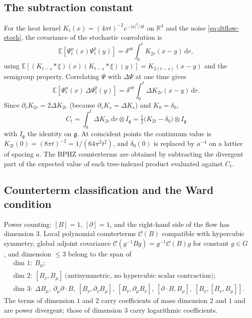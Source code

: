 \documentclass[11pt,a4paper]{article}
\theoremstyle{definition}
\theoremstyle{remark}
\newcommand{\R}{\mathbb{R}}
\newcommand{\E}{\mathbb{E}}
\newcommand{\g}{\mathfrak{g}}
\newcommand{\dd}{\mathrm{d}}
\begin{document}
\subsection{The subtraction constant}

For the heat kernel $K_t(x)=(4\pi t)^{-2}e^{-|x|^2/4t}$ on $\R^4$ and the noise \eqref{eq:dtflow-stoch}, the covariance of the stochastic convolution is
\begin{equation}
\E[\Psi^a_t(x)\Psi^b_t(y)]=\delta^{ab}\int_0^tK_{2r}(x-y)\,\dd r,
\end{equation}
using $\E[(K_{t-s}*\xi)(x)(K_{t-s}*\xi)(y)]=K_{2(t-s)}(x-y)$ and the semigroup property. Correlating $\Psi$ with $\Delta\Psi$ at one time gives
\begin{equation}
\E[\Psi^a_t(x)\,\Delta\Psi^b_t(y)]=\delta^{ab}\int_0^t\Delta K_{2r}(x-y)\,\dd r.
\end{equation}
Since $\partial_rK_{2r}=2\Delta K_{2r}$ (because $\partial_sK_s=\Delta K_s$) and $K_{0}=\delta_0$,
\begin{equation}\label{eq:Ct}
\boxed{\;C_t=\int_0^t\Delta K_{2r}\,\dd r\otimes I_{\g}=\tfrac12\bigl(K_{2t}-\delta_0\bigr)\otimes I_{\g}\;}
\end{equation}
with $I_{\g}$ the identity on $\g$. At coincident points the continuum value is $K_{2t}(0)=(8\pi t)^{-2}=1/(64\pi^2t^2)$, and $\delta_0(0)$ is replaced by $a^{-4}$ on a lattice of spacing $a$. The BPHZ counterterms are obtained by subtracting the divergent part of the expected value of each tree-indexed product evaluated against $C_t$.

\subsection{Counterterm classification and the Ward condition}

Power counting: $[B]=1$, $[\partial]=1$, and the right-hand side of the flow has dimension $3$. Local polynomial counterterms $\mathcal C(B)$ compatible with hypercubic symmetry, global adjoint covariance $\mathcal C(g^{-1}Bg)=g^{-1}\mathcal C(B)g$ for constant $g\in G$, and dimension $\le3$ belong to the span of
\begin{align*}
&\text{dim }1:\ B_\mu;\\
&\text{dim }2:\ [B_\nu,B_\mu]\ \text{(antisymmetric, no hypercubic scalar contraction)};\\
&\text{dim }3:\ \Delta B_\mu,\ \partial_\mu\partial\!\cdot\!B,\ [B_\nu,\partial_\nu B_\mu],\ [B_\nu,\partial_\mu B_\nu],\ [\partial\!\cdot\!B,B_\mu],\ [B_\nu,[B_\nu,B_\mu]].
\end{align*}
The terms of dimension $1$ and $2$ carry coefficients of mass dimension $2$ and $1$ and are power divergent; those of dimension $3$ carry logarithmic coefficients.
\end{document}
